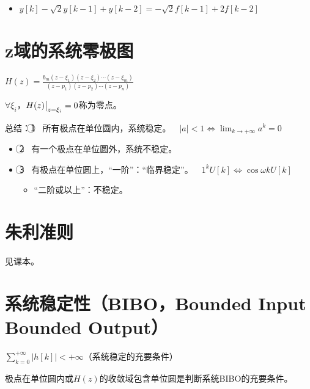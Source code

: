 \documentclass[UTF8]{ctexart}
\begin{document}
\begin{enumerate}[label=(\arabic*),itemindent=0pt,labelindent=\parindent,labelwidth=2em,labelsep=5pt,leftmargin=*]
\begin{figure}[h]
        \end{figure}
        \begin{itemize}[label=,left=2.25em]
          \item $y[k]-\sqrt{2}y[k-1]+y[k-2]=-\sqrt{2}f[k-1]+2f[k-2]$
        \end{itemize}
\end{enumerate}\par

\section{z域的系统零极图}
$H(z)=\frac{b_m(z-\xi_1)(z-\xi_2)\cdots(z-\xi_m)}{(z-p_1)(z-p_2)\cdots(z-p_n)}$ \par
$\forall\xi_i$，$H(z)\big{|}_{z=\xi_i}=0$称为零点。\par
\hspace*{\fill} \par
总结：\textcircled{1} \ 所有极点在单位圆内，系统稳定。$\quad |a|<1\Leftrightarrow \lim_{k\to+\infty}a^k=0$
\begin{itemize}[label=,left=4.5em]
  \item \textcircled{2} \ 有一个极点在单位圆外，系统不稳定。
  \item \textcircled{3} \ 有极点在单位圆上，“一阶”：“临界稳定”。$\quad1^kU[k]\Leftrightarrow\cos\omega kU[k]$
        \begin{itemize}[label=,left=10.15em]
          \item “二阶或以上”：不稳定。
        \end{itemize}
\end{itemize}

\section{朱利准则}
见课本。

\section{系统稳定性（BIBO，Bounded Input Bounded Output）}
$\sum_{k=0}^{+\infty}|h[k]|<+\infty$（系统稳定的充要条件）\par
极点在单位圆内或$H(z)$的收敛域包含单位圆是判断系统BIBO的充要条件。
\end{document}
